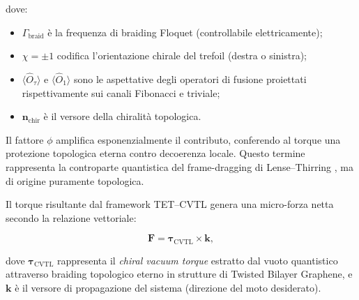 \documentclass[11pt,a4paper]{article}
\let\oldcite\cite
\renewcommand{\cite}{\protect\oldcite}
\theoremstyle{plain}
\theoremstyle{definition}
\begin{document}
\vspace{0.2cm}


dove:
\begin{itemize}
    \item $\Gamma_{\text{braid}}$ è la frequenza di braiding Floquet (controllabile elettricamente);
    \item $\chi = \pm 1$ codifica l'orientazione chirale del trefoil (destra o sinistra);
    \item $\langle \hat{O}_{\tau} \rangle$ e $\langle \hat{O}_{1} \rangle$ sono le aspettative degli operatori di fusione proiettati rispettivamente sui canali Fibonacci e triviale;
    \item $\mathbf{n}_{\text{chir}}$ è il versore della chiralità topologica.
\end{itemize}

Il fattore $\phi$ amplifica esponenzialmente il contributo, conferendo al torque una protezione topologica eterna contro decoerenza locale. Questo termine rappresenta la controparte quantistica del frame-dragging di Lense--Thirring \cite{LenseThirring1918}, ma di origine puramente topologica. 

\vspace{0.3cm}


\begin{tcolorbox}[
    colback=cyan!5!white,
    colframe=blue!70!black,
    coltitle=white,
    fonttitle=\bfseries,
    title=Torque Chirale dal Vuoto e Forza Netta risultante,
    sharp corners,
    boxrule=0.8pt,
    enhanced,
    attach boxed title to top left={xshift=10pt, yshift=-3mm},
    boxed title style={colback=teal!80!black}
]

Il torque risultante dal framework TET--CVTL genera una micro-forza netta secondo la relazione vettoriale:

\begin{equation}
\mathbf{F} = \boldsymbol{\tau}_{\text{CVTL}} \times \mathbf{k},
\label{eq:force_from_torque}
\end{equation}

dove \(\boldsymbol{\tau}_{\text{CVTL}}\) rappresenta il \emph{chiral vacuum torque} estratto dal vuoto quantistico attraverso braiding topologico eterno in strutture di Twisted Bilayer Graphene, e \(\mathbf{k}\) è il versore di propagazione del sistema (direzione del moto desiderato).



\end{tcolorbox}

\vspace{0.3cm}
\end{document}
